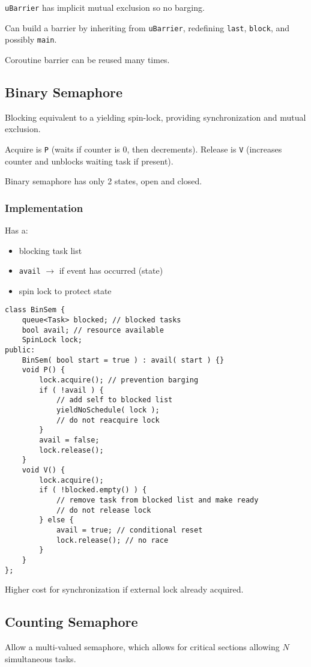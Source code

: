 \documentclass[11pt]{article}
\begin{document}
\texttt{uBarrier} has implicit mutual exclusion so no barging.

Can build a barrier by inheriting from \texttt{uBarrier}, redefining \texttt{last}, \texttt{block},
and possibly \texttt{main}.

Coroutine barrier can be reused many times.
\subsection{Binary Semaphore}
\label{sec:orgbe18ffa}
Blocking equivalent to a yielding spin-lock, providing synchronization and mutual exclusion.

Acquire is \texttt{P} (waits if counter is 0, then decrements).
Release is \texttt{V} (increases counter and unblocks waiting task if present).

Binary semaphore has only 2 states, open and closed.
\subsubsection{Implementation}
\label{sec:org821bf1e}
Has a:
\begin{itemize}
\item blocking task list
\item \texttt{avail} \(\to\) if event has occurred (state)
\item spin lock to protect state
\end{itemize}

\begin{verbatim}
class BinSem {
    queue<Task> blocked; // blocked tasks
    bool avail; // resource available
    SpinLock lock;
public:
    BinSem( bool start = true ) : avail( start ) {}
    void P() {
        lock.acquire(); // prevention barging
        if ( !avail ) {
            // add self to blocked list
            yieldNoSchedule( lock );
            // do not reacquire lock
        }
        avail = false;
        lock.release();
    }
    void V() {
        lock.acquire();
        if ( !blocked.empty() ) {
            // remove task from blocked list and make ready
            // do not release lock
        } else {
            avail = true; // conditional reset
            lock.release(); // no race
        }
    }
};
\end{verbatim}

Higher cost for synchronization if external lock already acquired.
\subsection{Counting Semaphore}
\label{sec:org02f2468}
Allow a multi-valued semaphore, which allows for critical sections allowing \(N\) simultaneous tasks.
\end{document}
